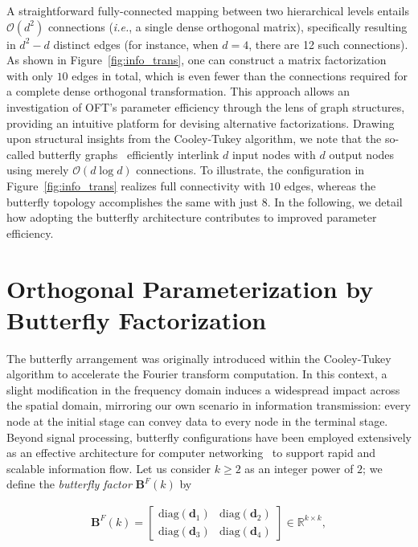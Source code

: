 A straightforward fully-connected mapping between two hierarchical levels entails $\mathcal{O}(d^2)$ connections (\emph{i.e.}, a single dense orthogonal matrix), specifically resulting in $d^2-d$ distinct edges (for instance, when $d=4$, there are 12 such connections). As shown in Figure~\ref{fig:info_trans}, one can construct a matrix factorization with only $10$ edges in total, which is even fewer than the connections required for a complete dense orthogonal transformation. This approach allows an investigation of OFT's parameter efficiency through the lens of graph structures, providing an intuitive platform for devising alternative factorizations. Drawing upon structural insights from the Cooley-Tukey algorithm, we note that the so-called butterfly graphs~\cite{cooley1965algorithm} efficiently interlink $d$ input nodes with $d$ output nodes using merely $\mathcal{O}(d\log d)$ connections. To illustrate, the configuration in Figure~\ref{fig:info_trans} realizes full connectivity with $10$ edges, whereas the butterfly topology accomplishes the same with just $8$. In the following, we detail how adopting the butterfly architecture contributes to improved parameter efficiency.

\section{Orthogonal Parameterization by Butterfly Factorization}

The butterfly arrangement was originally introduced within the Cooley-Tukey algorithm to accelerate the Fourier transform computation. In this context, a slight modification in the frequency domain induces a widespread impact across the spatial domain, mirroring our own scenario in information transmission: every node at the initial stage can convey data to every node in the terminal stage. Beyond signal processing, butterfly configurations have been employed extensively as an effective architecture for computer networking~\cite{solihin2015fundamentals,li2011linear} to support rapid and scalable information flow. Let us consider $k \geq 2$ as an integer power of $2$; we define the \emph{butterfly factor} $\bm{B}^F(k)$ by

\begin{equation}\label{eq:but_factor}
\begin{aligned}
    \bm{B}^F(k)=\begin{bmatrix}
    \text{diag}(\bm{d}_1) & \text{diag}(\bm{d}_2) \\
    \text{diag}(\bm{d}_3) & \text{diag}(\bm{d}_4)
    \end{bmatrix}\in\mathbb{R}^{k\times k},
\end{aligned}
\end{equation}

